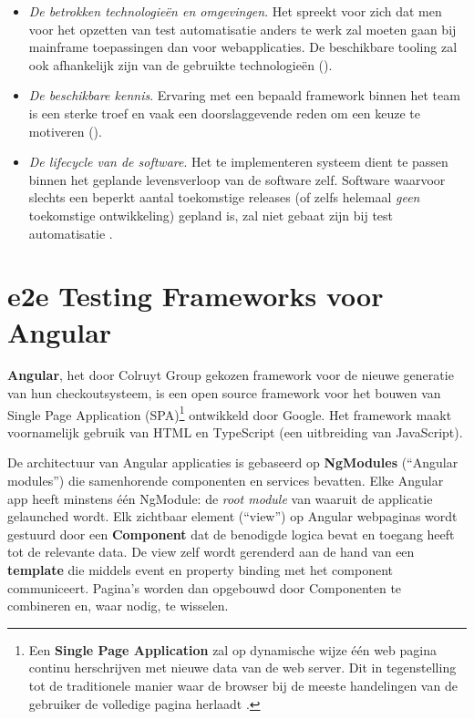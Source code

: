 \begin{itemize}
    \item \emph{De betrokken technologieën en omgevingen}. Het spreekt voor zich dat men voor het opzetten van test automatisatie anders te werk zal moeten gaan bij mainframe toepassingen dan voor webapplicaties. De beschikbare tooling zal ook afhankelijk zijn van de gebruikte technologieën (\cite{10.1145/1295014.1295062}).
    \item \emph{De beschikbare kennis}. Ervaring met een bepaald framework binnen het team is een sterke troef en vaak een doorslaggevende reden om een keuze te motiveren (\cite{Madan2013}).
    \item \emph{De lifecycle van de software}. Het te implementeren systeem dient te passen binnen het geplande levensverloop van de software zelf. Software waarvoor slechts een beperkt aantal toekomstige releases (of zelfs helemaal \emph{geen} toekomstige ontwikkeling) gepland is, zal niet gebaat zijn bij test automatisatie \autocite{Tiitinen2013}.
\end{itemize}

\section{e2e Testing Frameworks voor Angular}

\textbf{Angular}, het door Colruyt Group gekozen framework voor de nieuwe generatie van hun checkoutsysteem, is een open source framework voor het bouwen van Single Page Application (SPA)\footnote{Een \textbf{Single Page Application} zal op dynamische wijze één web pagina continu herschrijven met nieuwe data van de web server. Dit in tegenstelling tot de traditionele manier waar de browser bij de meeste handelingen van de gebruiker de volledige pagina herlaadt \autocite{Neoteric2016}.} ontwikkeld door Google. Het framework maakt voornamelijk gebruik van HTML en TypeScript (een uitbreiding van JavaScript). \autocite{AngularArchitecture}

De architectuur van Angular applicaties is gebaseerd op \textbf{NgModules} (``Angular modules'') die samenhorende componenten en services bevatten. Elke Angular app heeft minstens één NgModule: de \emph{root module} van waaruit de applicatie gelaunched wordt. Elk zichtbaar element (``view'') op Angular webpaginas wordt gestuurd door een \textbf{Component} dat de benodigde logica bevat en toegang heeft tot de relevante data. De view zelf wordt gerenderd aan de hand van een \textbf{template} die middels event en property binding met het component communiceert. Pagina's worden dan opgebouwd door Componenten te combineren en, waar nodig, te wisselen. \autocite{Tuzi2018,Garg2019,AngularArchitecture}

